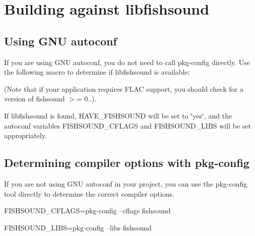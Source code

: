 \section{Building against libfishsound}
\label{group__building}
\subsection{Using G\-N\-U autoconf}\label{group__building_autoconf}
If you are using G\-N\-U autoconf, you do not need to call pkg-\/config directly. Use the following macro to determine if libfishsound is available\-:


 (Note that if your application requires F\-L\-A\-C support, you should check for a version of fishsound $>$= 0..).

If libfishsound is found, H\-A\-V\-E\-\_\-\-F\-I\-S\-H\-S\-O\-U\-N\-D will be set to \char`\"{}yes\char`\"{}, and the autoconf variables F\-I\-S\-H\-S\-O\-U\-N\-D\-\_\-\-C\-F\-L\-A\-G\-S and F\-I\-S\-H\-S\-O\-U\-N\-D\-\_\-\-L\-I\-B\-S will be set appropriately.\subsection{Determining compiler options with pkg-\/config}\label{group__building_pkg-config}
If you are not using G\-N\-U autoconf in your project, you can use the pkg-\/config tool directly to determine the correct compiler options.


\begin{DoxyPre}
FISHSOUND\_CFLAGS={\ttfamily pkg-config --cflags fishsound}\end{DoxyPre}



\begin{DoxyPre}FISHSOUND\_LIBS={\ttfamily pkg-config --libs fishsound}
\end{DoxyPre}
 